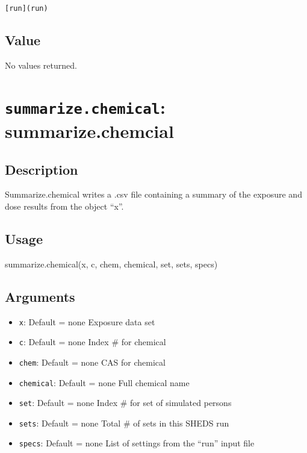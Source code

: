 \documentclass[
]{article}
\newenvironment{Shaded}{\begin{snugshade}}{\end{snugshade}}
\newcommand{\FunctionTok}[1]{\textcolor[rgb]{0.00,0.00,0.00}{#1}}
\newcommand{\NormalTok}[1]{#1}
\providecommand{\tightlist}{%
  \setlength{\itemsep}{0pt}\setlength{\parskip}{0pt}}
\begin{document}
\texttt{{[}run{]}(run)}

\hypertarget{value-34}{%
\subsection{Value}\label{value-34}}

No values returned.

\hypertarget{summarize.chemical-summarize.chemcial}{%
\section{\texorpdfstring{\texttt{summarize.chemical}:
summarize.chemcial}{summarize.chemical: summarize.chemcial}}\label{summarize.chemical-summarize.chemcial}}

\hypertarget{description-52}{%
\subsection{Description}\label{description-52}}

Summarize.chemical writes a .csv file containing a summary of the
exposure and dose results from the object ``x''.

\hypertarget{usage-52}{%
\subsection{Usage}\label{usage-52}}

\begin{Shaded}
\begin{Highlighting}[]
\FunctionTok{summarize.chemical}\NormalTok{(x, c, chem, chemical, set, sets, specs)}
\end{Highlighting}
\end{Shaded}

\hypertarget{arguments-37}{%
\subsection{Arguments}\label{arguments-37}}

\begin{itemize}
\tightlist
\item
  \texttt{x}: Default = none Exposure data set
\item
  \texttt{c}: Default = none Index \# for chemical
\item
  \texttt{chem}: Default = none CAS for chemical
\item
  \texttt{chemical}: Default = none Full chemical name
\item
  \texttt{set}: Default = none Index \# for set of simulated persons
\item
  \texttt{sets}: Default = none Total \# of sets in this SHEDS run
\item
  \texttt{specs}: Default = none List of settings from the ``run'' input
  file
\end{itemize}
\end{document}
